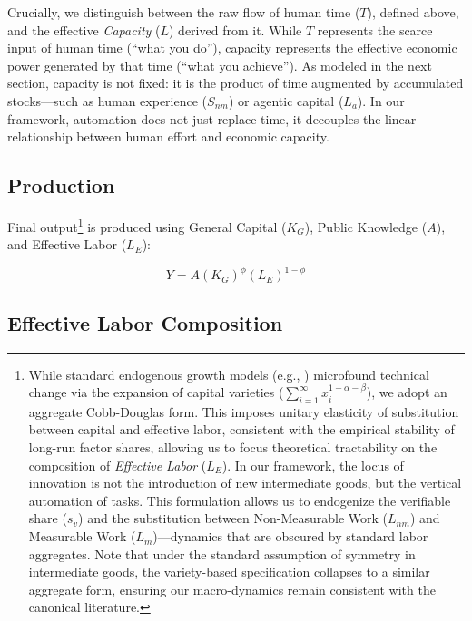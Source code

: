 \documentclass[12pt, letter]{article}
\begin{document}
Crucially, we distinguish between the raw flow of human time ($T$), defined above, and the effective \textit{Capacity} ($L$) derived from it. While $T$ represents the scarce input of human time (``what you do''), capacity represents the effective economic power generated by that time (``what you achieve''). As modeled in the next section, capacity is not fixed: it is the product of time augmented by accumulated stocks—such as human experience ($S_{nm}$) or agentic capital ($L_a$). In our framework, automation does not just replace time, it decouples the linear relationship between human effort and economic capacity.

\subsection{Production}

Final output\footnote{While standard endogenous growth models (e.g., \cite{Romer90}) microfound technical change via the expansion of capital varieties ($\sum_{i=1}^{\infty} x_i^{1-\alpha-\beta}$), we adopt an aggregate Cobb-Douglas form. This imposes unitary elasticity of substitution between capital and effective labor, consistent with the empirical stability of long-run factor shares, allowing us to focus theoretical tractability on the composition of \textit{Effective Labor} ($L_E$). In our framework, the locus of innovation is not the introduction of new intermediate goods, but the vertical automation of tasks. This formulation allows us to endogenize the verifiable share ($s_v$) and the substitution between Non-Measurable Work ($L_{nm}$) and Measurable Work ($L_m$)—dynamics that are obscured by standard labor aggregates. Note that under the standard assumption of symmetry in intermediate goods, the variety-based specification collapses to a similar aggregate form, ensuring our macro-dynamics remain consistent with the canonical literature.} is produced using General Capital ($K_G$), Public Knowledge ($A$), and Effective Labor ($L_E$):

\begin{equation}
    Y = A (K_G)^\phi (L_E)^{1-\phi}
\end{equation}

\subsection{Effective Labor Composition}
\end{document}
